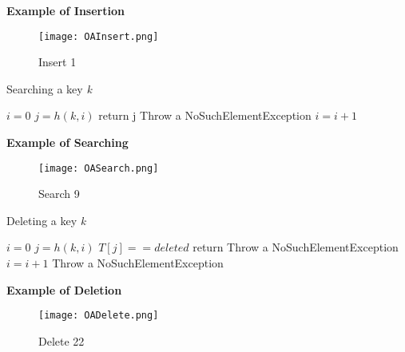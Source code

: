 \documentclass[10pt, 
a4paper, 
oneside, 
headinclude, footinclude, 
BCOR5mm]
{scrartcl}
\begin{document}
\textbf{Example of Insertion}
\begin{figure}[H]
    \begin{center}
        \texttt{[image: OAInsert.png]}
        \caption{Insert 1}
    \end{center}   
\end{figure}
\begin{algorithm}
    \caption{Searching a key \textit{k}}
    $i = 0$\;
        {$j=h(k,i)$\;
            {return j\;}
            {Throw a NoSuchElementException\;}
        $i=i+1$\;}
\end{algorithm}
\newpage
\textbf{Example of Searching}
\begin{figure}[H]
    \begin{center}
        \texttt{[image: OASearch.png]}
        \caption{Search 9}
    \end{center}   
\end{figure}

\begin{algorithm}
    \caption{Deleting a key \textit{k}}
    $i = 0$\;
        {$j=h(k,i)$\;
            {$T[j]==deleted$\;
            return\;}
            {Throw a NoSuchElementException\;}
        $i=i+1$\;}
    Throw a NoSuchElementException\;
\end{algorithm}
\newpage
\textbf{Example of Deletion}
\begin{figure}[H]
    \begin{center}
        \texttt{[image: OADelete.png]}
        \caption{Delete 22}
    \end{center}   
\end{figure}
\newpage
\end{document}
